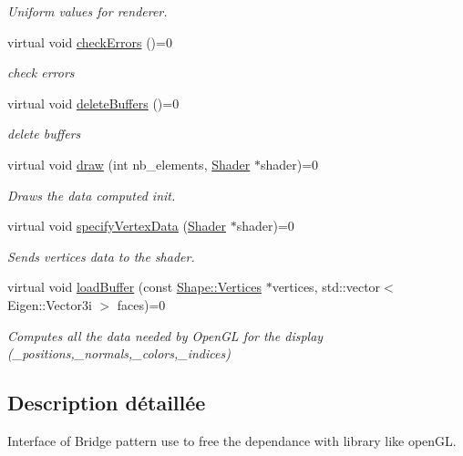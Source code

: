 \begin{DoxyCompactItemize}
\begin{DoxyCompactList}\small\item\em Uniform values for renderer. \end{DoxyCompactList}\item 
virtual void \hyperlink{class_rendering_a93693702cf5a7709a7b1ddc7a7d3d8d3}{check\+Errors} ()=0
\begin{DoxyCompactList}\small\item\em check errors \end{DoxyCompactList}\item 
virtual void \hyperlink{class_rendering_a43cc4c8b7b4d9813773b42c97a7405d5}{delete\+Buffers} ()=0
\begin{DoxyCompactList}\small\item\em delete buffers \end{DoxyCompactList}\item 
virtual void \hyperlink{class_rendering_abeffb3c261cd9b5c6b885aaf8e321ef2}{draw} (int nb\+\_\+elements, \hyperlink{class_shader}{Shader} $\ast$shader)=0
\begin{DoxyCompactList}\small\item\em Draws the data computed init. \end{DoxyCompactList}\item 
virtual void \hyperlink{class_rendering_aecb85f0a1da2d14cde84a918e2636841}{specify\+Vertex\+Data} (\hyperlink{class_shader}{Shader} $\ast$shader)=0
\begin{DoxyCompactList}\small\item\em Sends vertices data to the shader. \end{DoxyCompactList}\item 
virtual void \hyperlink{class_rendering_aa753ed0c94b2ece92afd26a58aef4f79}{load\+Buffer} (const \hyperlink{struct_shape_1_1_vertices}{Shape\+::\+Vertices} $\ast$vertices, std\+::vector$<$ Eigen\+::\+Vector3i $>$ faces)=0
\begin{DoxyCompactList}\small\item\em Computes all the data needed by Open\+GL for the display (\+\_\+positions,\+\_\+normals,\+\_\+colors,\+\_\+indices) \end{DoxyCompactList}\end{DoxyCompactItemize}


\subsection{Description détaillée}
Interface of Bridge pattern use to free the dependance with library like open\+GL. 

